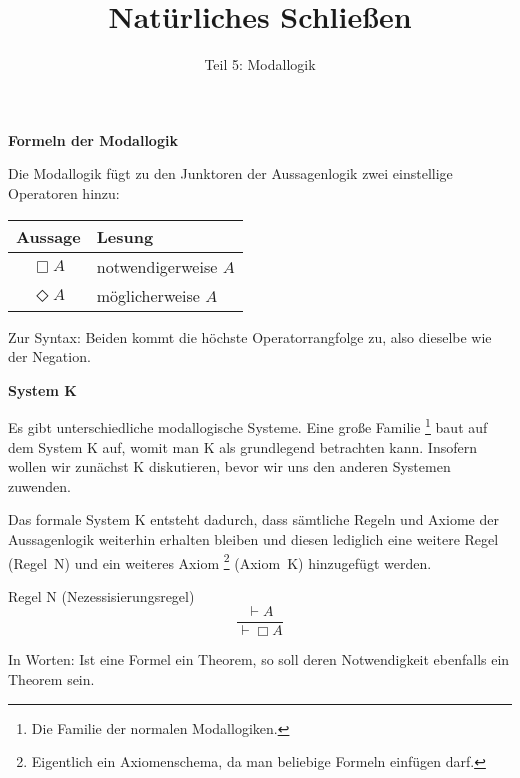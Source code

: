 \documentclass[8pt]{beamer}
\title{Natürliches Schließen}
\subtitle{Teil 5: Modallogik}
\date{}
\newcommand{\strong}[1]{\textsf{\textbf{#1}}}
\newcommand{\centerheadline}[1]{%
  \begin{center}\strong{#1}\end{center}}
\newcommand{\parspace}{\vspace{0.8em}}
\newcommand{\lnec}{\Box}
\newcommand{\lpos}{\Diamond}
\begin{document}
\begin{frame}
\maketitle
\end{frame}

\begin{frame}
\centerheadline{Formeln der Modallogik}
\end{frame}

\begin{frame}
Die Modallogik fügt zu den Junktoren der Aussagenlogik zwei
einstellige Operatoren hinzu:

\begin{center}
\begin{tabular}{cl}
\toprule
\strong{Aussage} & \strong{Lesung}\\
\midrule[\heavyrulewidth]
$\lnec A$ & notwendigerweise $A$\\
$\lpos A$ & möglicherweise $A$\\
\bottomrule
\end{tabular}
\end{center}
Zur Syntax: Beiden kommt die höchste Operatorrangfolge zu, also
dieselbe wie der Negation.

\end{frame}

\begin{frame}
\centerheadline{System K}
\end{frame}

\begin{frame}
Es gibt unterschiedliche modallogische Systeme. Eine große Familie%
\footnote{Die Familie der normalen Modallogiken.}
baut auf dem System K auf, womit man K als grundlegend betrachten
kann. Insofern wollen wir zunächst K diskutieren, bevor wir
uns den anderen Systemen zuwenden.

\parspace
Das formale System K entsteht dadurch, dass sämtliche Regeln und Axiome
der Aussagenlogik weiterhin erhalten bleiben und diesen lediglich eine
weitere Regel (Regel~N) und ein weiteres Axiom%
\footnote{Eigentlich ein Axiomenschema,
da man beliebige Formeln einfügen darf.}
(Axiom~K) hinzugefügt werden.\pause

\parspace
\begin{block}{Regel N (Nezessisierungsregel)}
\[\dfrac{\vdash A}{\vdash\lnec A}\]
\end{block}
In Worten: Ist eine Formel ein Theorem, so soll deren
Notwendigkeit ebenfalls ein Theorem sein.
\end{frame}
\end{document}
